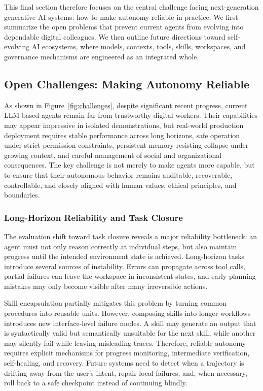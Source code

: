 This final section therefore focuses on the central challenge facing next-generation generative AI systems: how to make autonomy reliable in practice. We first summarize the open problems that prevent current agents from evolving into dependable digital colleagues. We then outline future directions toward self-evolving AI ecosystems, where models, contexts, tools, skills, workspaces, and governance mechanisms are engineered as an integrated whole.




\subsection{Open Challenges: Making Autonomy Reliable}

As shown in Figure~\ref{fig:challenges}, despite significant recent progress, current LLM-based agents remain far from trustworthy digital workers. Their capabilities may appear impressive in isolated demonstrations, but real-world production deployment requires stable performance across long horizons, safe operation under strict permission constraints, persistent memory resisting collapse under growing context, and careful management of social and organizational consequences. The key challenge is not merely to make agents more capable, but to ensure that their autonomous behavior remains auditable, recoverable, controllable, and closely aligned with human values, ethical principles, and boundaries.

\subsubsection{Long-Horizon Reliability and Task Closure}

The evaluation shift toward task closure reveals a major reliability bottleneck: an agent must not only reason correctly at individual steps, but also maintain progress until the intended environment state is achieved. Long-horizon tasks introduce several sources of instability. Errors can propagate across tool calls, partial failures can leave the workspace in inconsistent states, and early planning mistakes may only become visible after many irreversible actions.

Skill encapsulation partially mitigates this problem by turning common procedures into reusable units. However, composing skills into longer workflows introduces new interface-level failure modes. A skill may generate an output that is syntactically valid but semantically unsuitable for the next skill, while another may silently fail while leaving misleading traces. Therefore, reliable autonomy requires explicit mechanisms for progress monitoring, intermediate verification, self-healing, and recovery. Future systems need to detect when a trajectory is drifting away from the user's intent, repair local failures, and, when necessary, roll back to a safe checkpoint instead of continuing blindly.

